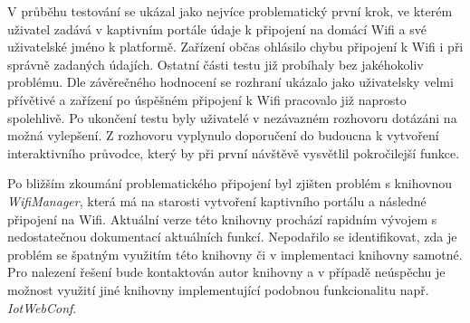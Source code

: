 V průběhu testování se ukázal jako nejvíce problematický první krok, ve kterém uživatel zadává v kaptivním portále údaje k připojení na domácí Wifi a své uživatelské jméno k platformě. Zařízení občas ohlásilo chybu připojení k Wifi i při správně zadaných údajích. Ostatní části testu již probíhaly bez jakéhokoliv problému. Dle závěrečného hodnocení se rozhraní ukázalo jako uživatelsky velmi přívětivé a zařízení po úspěšném připojení k Wifi pracovalo již naprosto spolehlivě. Po ukončení testu byly uživatelé v nezávazném rozhovoru dotázáni na možná vylepšení. Z rozhovoru vyplynulo doporučení do budoucna k vytvoření interaktivního průvodce, který by při první návštěvě vysvětlil pokročilejší funkce.

Po bližším zkoumání problematického připojení byl zjišten problém s knihovnou \textit{WifiManager}, která má na starosti vytvoření kaptivního portálu a následné připojení na Wifi. Aktuální verze této knihovny prochází rapidním vývojem s nedostatečnou dokumentací aktuálních funkcí. Nepodařilo se identifikovat, zda je problém se špatným využitím této knihovny či v implementaci knihovny samotné. Pro nalezení řešení bude kontaktován autor knihovny a v případě neúspěchu je možnost využití jiné knihovny implementující podobnou funkcionalitu např. \textit{IotWebConf}.